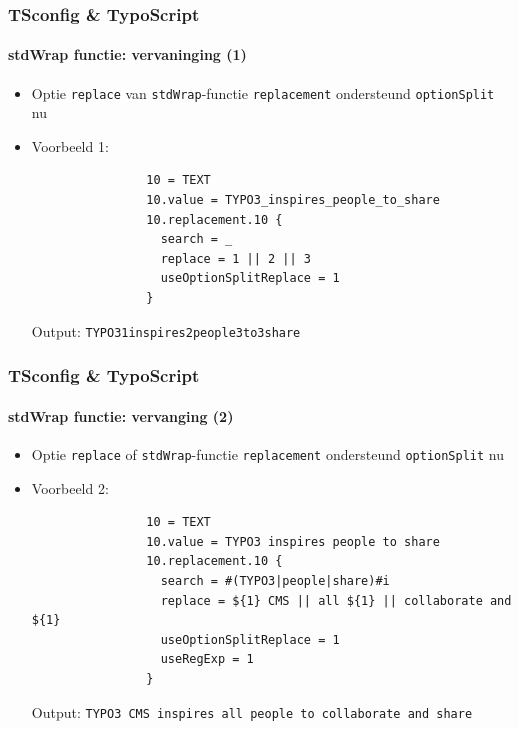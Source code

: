 \begin{frame}[fragile]
	\frametitle{TSconfig \& TypoScript}
	\framesubtitle{stdWrap functie: vervaninging (1)}

	\begin{itemize}
		\item Optie \texttt{replace} van \texttt{stdWrap}-functie \texttt{replacement}\newline
			ondersteund \texttt{optionSplit} nu

		\item Voorbeeld 1:

			\begin{lstlisting}
				10 = TEXT
				10.value = TYPO3_inspires_people_to_share
				10.replacement.10 {
				  search = _
				  replace = 1 || 2 || 3
				  useOptionSplitReplace = 1
				}
			\end{lstlisting}

			Output:\newline
				\texttt{TYPO31inspires2people3to3share}

	\end{itemize}

\end{frame}


\begin{frame}[fragile]
	\frametitle{TSconfig \& TypoScript}
	\framesubtitle{stdWrap functie: vervanging (2)}

	\begin{itemize}
		\item Optie \texttt{replace} of \texttt{stdWrap}-functie \texttt{replacement}\newline
			ondersteund \texttt{optionSplit} nu

		\item Voorbeeld 2:

			\begin{lstlisting}
				10 = TEXT
				10.value = TYPO3 inspires people to share
				10.replacement.10 {
				  search = #(TYPO3|people|share)#i
				  replace = ${1} CMS || all ${1} || collaborate and ${1}
				  useOptionSplitReplace = 1
				  useRegExp = 1
				}
			\end{lstlisting}

			Output:\newline
				\texttt{TYPO3 CMS inspires all people to collaborate and share}

	\end{itemize}

\end{frame}

